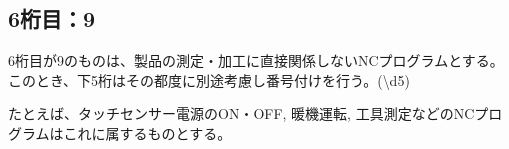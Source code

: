 \subsection{6桁目：9}
6桁目が9のものは、製品の測定・加工に直接関係しないNCプログラムとする。
このとき、下5桁はその都度に別途考慮し番号付けを行う。({\textbackslash d{5}})
\begin{hosoku}
たとえば、タッチセンサー電源のON・OFF, 暖機運転, 工具測定などのNCプログラムはこれに属するものとする。
\end{hosoku}


